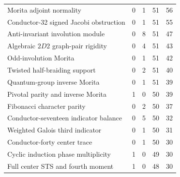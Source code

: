 \begin{tabular}{@{}lrrrr@{}}
Morita adjoint normality & 0 & 1 & 51 & 56\\
Conductor-32 signed Jacobi obstruction & 0 & 1 & 51 & 55\\
Anti-invariant involution module & 0 & 8 & 51 & 47\\
Algebraic $2D2$ graph-pair rigidity & 0 & 4 & 51 & 43\\
Odd-involution Morita & 0 & 1 & 51 & 42\\
Twisted half-braiding support & 0 & 2 & 51 & 40\\
Quantum-group inverse Morita & 0 & 1 & 51 & 39\\
Pivotal parity and inverse Morita & 1 & 0 & 50 & 39\\
Fibonacci character parity & 0 & 2 & 50 & 37\\
Conductor-seventeen indicator balance & 0 & 5 & 50 & 32\\
Weighted Galois third indicator & 0 & 1 & 50 & 31\\
Conductor-forty center trace & 0 & 1 & 50 & 30\\
Cyclic induction phase multiplicity & 1 & 0 & 49 & 30\\
Full center STS and fourth moment & 1 & 0 & 48 & 30\\
\bottomrule
\end{tabular}
